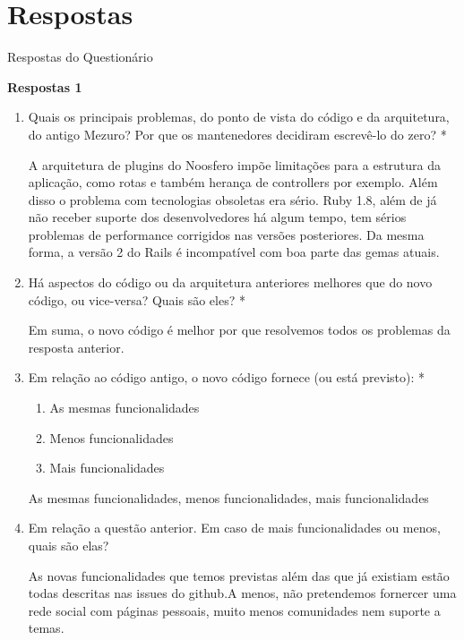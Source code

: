 \newpage
\section{Respostas}
\label{resp-pesquisa}

{\large Respostas do Questionário}

\textbf{Respostas 1}

\begin{enumerate}
\item Quais os principais problemas, do ponto de vista do código e da arquitetura, do antigo Mezuro? Por que os mantenedores decidiram escrevê-lo do zero? *
  \begin{mdframed}
A arquitetura de plugins do Noosfero impõe limitações para a estrutura da aplicação, como rotas e também herança de controllers por exemplo. Além disso o problema com tecnologias obsoletas era sério. Ruby 1.8, além de já não receber suporte dos desenvolvedores há algum tempo, tem sérios problemas de performance corrigidos nas versões posteriores. Da mesma forma, a versão 2 do Rails é incompatível com boa parte das gemas atuais.
  \end{mdframed}
\item Há aspectos do código ou da arquitetura anteriores melhores que do novo código, ou vice-versa? Quais são eles? *
  \begin{mdframed}
Em suma, o novo código é melhor por que resolvemos todos os problemas da resposta anterior.
  \end{mdframed}
\item Em relação ao código antigo, o novo código fornece (ou está previsto): *
  \begin{enumerate}
  \item As mesmas funcionalidades
  \item Menos funcionalidades
  \item Mais funcionalidades 
  \end{enumerate}
    \begin{mdframed}
    As mesmas funcionalidades, menos funcionalidades, mais funcionalidades
    \end{mdframed}
\item Em relação a questão anterior. Em caso de mais funcionalidades ou menos, quais são elas? 
  \begin{mdframed}
As novas funcionalidades que temos previstas além das que já existiam estão todas descritas nas issues do github.A menos, não pretendemos fornercer uma rede social com páginas pessoais, muito menos comunidades nem suporte a temas.
  \end{mdframed}
\end{enumerate}

